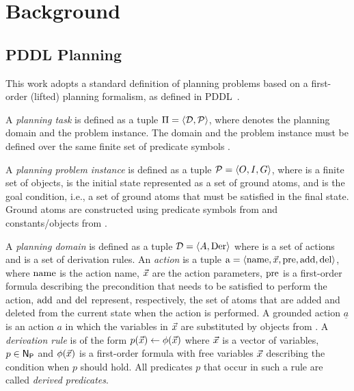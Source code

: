 \section{Background}\label{planta:sec:background}


\subsection{PDDL Planning}\label{planta:sec:bg_planning}

This work adopts a standard definition of planning problems based on a first-order (lifted) planning formalism, as defined in PDDL~\cite{fox2003pddl2}.

A \emph{planning task} is defined as a tuple $\Pi = \langle \mathcal{D}, \mathcal{P} \rangle$, where \pddlDomain denotes the planning domain and \pddlInstance the problem instance. The domain and the problem instance must be defined over the same finite set of predicate symbols \pddlPredicates.

A \emph{planning problem instance} is defined as a tuple $\mathcal{P}= \langle O, I, G \rangle$, where \pddlObjects is a finite set of objects, \pddlInitial is the initial state represented as a set of ground atoms, and \pddlGoal is the goal condition, i.e., a set of ground atoms that must be satisfied in the final state. Ground atoms are constructed using predicate symbols from \pddlPredicates and constants/objects from \pddlObjects.

A \emph{planning domain} is defined as a tuple $\mathcal{D} = \langle A, \text{Der} \rangle$ where \pddlActions is a set of actions and \pddlDerRules is a set of derivation rules.
An \emph{action} is a tuple $\operatorname{a} = \langle \operatorname{name}, \vec{x}, \operatorname{pre}, \operatorname{add}, \operatorname{del} \rangle$, where $\operatorname{name}$ is the action name, $\vec{x}$ are the action parameters, $\operatorname{pre}$ is a first-order formula describing the precondition that needs to be satisfied to perform the action, $\operatorname{add}$ and $\operatorname{del}$ represent, respectively, the set of atoms that are added and deleted from the current state when the action is performed. A grounded action $\underline{a}$ is an action $a$ in which the variables in $\vec{x}$ are substituted by objects from \pddlObjects.
A \emph{derivation rule} is of the form $p(\vec{x}) \leftarrow \phi(\vec{x})$ where $\vec{x}$ is a vector of variables, $p \in \mathsf{N}_\mathsf{P}$ and $\phi(\vec{x})$ is a first-order formula with free variables $\vec{x}$ describing the condition when $p$ should hold. All predicates $p$ that occur in such a rule are called \emph{derived predicates}.

